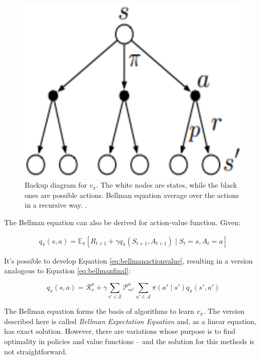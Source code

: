 \begin{figure}[!htpb]
	\centering
	\includegraphics[scale=0.3]{Cap4/bellmaneqtree.eps}
	\caption{Backup diagram for $v_{\pi}$. The white nodes are states, while the black ones are possible actions. Bellman equation average over the actions in a recursive way. \cite{sutton1998rli}.}
	\label{fig:bellmaneqtree}
\end{figure}

The Bellman equation can also be derived for action-value function. Given:

\begin{align}\label{eq:bellmanactionvalue}
q_{\pi}(s,a) = \mathbb{E}_{\pi}[R_{t+1} + \gamma q_{\pi}(S_{t+1}, A_{t+1}) \mid S_{t} = s, A_{t} = a]
\end{align}

It's possible to develop Equation \ref{eq:bellmanactionvalue}, resulting in a version analogous to Equation \ref{eq:bellmanfinal}:

\begin{equation}
q_{\pi}(s,a) = \mathcal{R}_{s}^{a} + \gamma \sum_{s' \in \mathcal{S}} \mathcal{P}_{ss'}^{a}\sum_{a' \in \mathcal{A}} \pi(a' \mid s')q_{\pi}(s', a')
\end{equation}

The Bellman equation forms the basis of algorithms to learn $v_{\pi}$. The version described here is called \textit{Bellman Expectation Equation} and, as a linear equation, has exact solution. However, there are variations whose purpose is to find optimality in policies and value functions -- and the solution for this methods is not straightforward.

